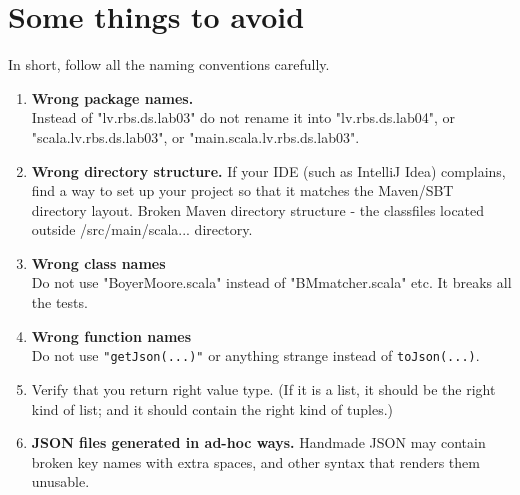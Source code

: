 \documentclass[jou]{apa6}
\begin{document}
\section{Some things to avoid}

In short, follow all the naming conventions carefully.

\begin{enumerate}[(1)]
\item {\bf Wrong package names.}\\
Instead of  "lv.rbs.ds.lab03" do not rename it into 
"lv.rbs.ds.lab04", or "scala.lv.rbs.ds.lab03", or "main.scala.lv.rbs.ds.lab03". 
\item {\bf Wrong directory structure.}
If your IDE (such as IntelliJ Idea) 
complains, find a way to set up your project so that it matches the Maven/SBT directory layout.
Broken Maven directory structure - the classfiles located outside /src/main/scala... directory.
\item {\bf Wrong class names}\\
Do not use "BoyerMoore.scala" instead of "BMmatcher.scala" etc. It breaks all the tests.
\item {\bf Wrong function names}\\
Do not use {\tt "get\textunderscore{}Json(...)"} or anything strange instead of {\tt toJson(...)}. 
\item Verify that you return right value type. (If it is a list, it should be the right kind of list; and it should 
contain the right kind of tuples.)
\item {\bf JSON files generated in ad-hoc ways.} Handmade JSON may contain broken key names with extra spaces, and other syntax that renders 
them unusable.
\end{enumerate}
\end{document}
